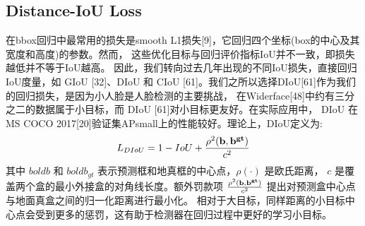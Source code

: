 \documentclass[twocolumn,10pt,a4paper]{article}%
\begin{document}
	\subsection{Distance-IoU Loss}
	在bbox回归中最常用的损失是smooth L1损失[9]，它回归四个坐标(box的中心及其宽度和高度)的参数。然而， 这些优化目标与回归评价指标IoU并不一致，即损失越低并不等于IoU越高。
	因此，我们转向过去几年出现的不同IoU损失，直接回归IoU度量，如 GIoU [32]、DIoU 和 CIoU [61]。我们之所以选择DIoU[61]作为我们的回归损失，是因为小人脸是人脸检测的主要挑战，
	在Widerface[48]中约有三分之二的数据属于小目标，而 DIoU [61]对小目标更友好。在实际应用中， DIoU 在MS COCO 2017[20]验证集APsmall上的性能较好。理论上，DIoU定义为:
	\begin{equation}
		L_{DIoU}=1-IoU+\frac{\rho^{2}(\bold{b},\bold{b^{gt}})}{c^{2}}
	\end{equation}
	其中 $bold{b}$ 和 $bold{b_{gt}}$ 表示预测框和地真框的中心点，$\rho(·)$ 是欧氏距离， $c$ 是覆盖两个盒的最小外接盒的对角线长度。额外罚款项
	$\frac{\rho^{2}(\bold{b},\bold{b^{gt}})}{c^{2}}$ 提出对预测盒中心点与地面真盒之间的归一化距离进行最小化。
	相对于大目标，同样距离的小目标中心点会受到更多的惩罚，这有助于检测器在回归过程中更好的学习小目标。



\end{document}
